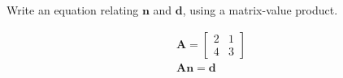 Write an equation relating $\boldsymbol{n}$ and $\boldsymbol{d}$, using a matrix-value product.

\begin{solution}
    \begin{align*}
        \boldsymbol{A} = \begin{bmatrix}
            2 & 1 \\
            4 & 3
        \end{bmatrix} \\
        \boldsymbol{An} = \boldsymbol{d}
    \end{align*}
\end{solution}